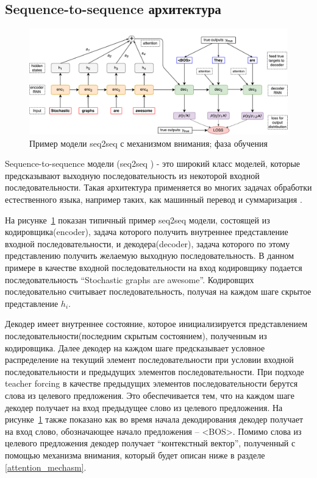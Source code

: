 \documentclass[14pt, a4paper]{extarticle}
\begin{document}
\subsection{Sequence-to-sequence архитектура}
\begin{figure}
\centering
\includegraphics[width=1.0\linewidth]{seq2seq.pdf}
\caption{Пример модели seq2seq с механизмом внимания; фаза обучения}
\label{fig:seq2seq}
\end{figure}
Sequence-to-sequence модели (seq2seq \cite{seq2seq}) - это широкий класс моделей, которые предсказывают выходную последовательность из
некоторой входной последовательности. Такая архитектура применяется во многих задачах обработки естественного языка,
например таких, как машинный перевод \cite{mt} и суммаризация \cite{first_summ}.

На рисунке~\ref{fig:seq2seq} показан типичный пример seq2seq модели, состоящей из кодировщика(encoder), задача которого получить
 внутреннее представление входной последовательности, и декодера(decoder), задача которого по этому представлению получить желаемую выходную последовательность.
 В данном примере в качестве входной последовательности на вход кодировщику подается последовательность ``Stochastic graphs are awesome''.
 Кодировщих последовательно считывает последовательность, получая на каждом шаге скрытое представление $h_i$. 

 Декодер имеет внутреннее состояние, которое инициализируется представлением последовательности(последним скрытым состоянием), полученным из кодировщика.
Далее декодер на каждом шаге предсказывает условное распределение на текущий элемент последовательности при условии входной последовательности и предыдущих элементов последовательности. 
При подходе teacher forcing \cite{teacher_forcing} в качестве предыдущих элементов последовательности берутся слова из целевого предложения.
Это обеспечивается тем, что на каждом шаге декодер получает на вход предыдущее слово из целевого предложения.
На рисунке~\ref{fig:seq2seq} также показано как во время начала декодирования декодер получает на вход слово, обозначающее начало предложения -- <BOS>.
Помимо слова из целевого предложения декодер получает ``контекстный вектор'', полученный с помощью механизма внимания, который будет описан ниже в разделе \ref{attention_mechasm}.
\end{document}
